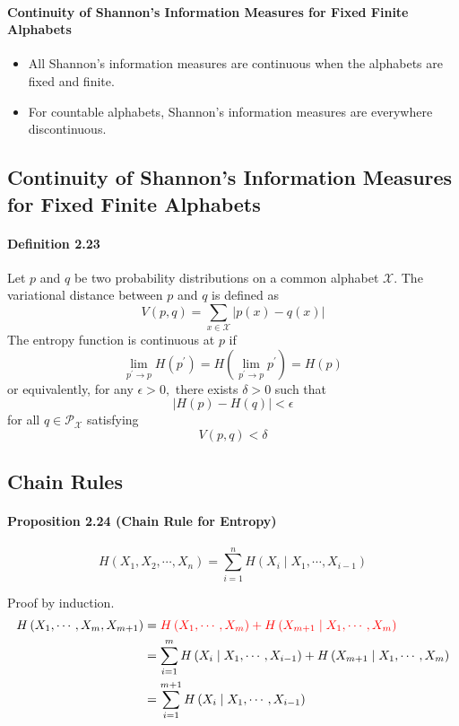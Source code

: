 \documentclass[8pt]{article}
\begin{document}
\paragraph{Continuity of Shannon’s Information Measures for Fixed Finite Alphabets}
\begin{itemize}
	\item All Shannon’s information measures are continuous when the alphabets are fixed and finite.
	\item For countable alphabets, Shannon’s information measures are everywhere discontinuous.
\end{itemize}

\subsection{Continuity of Shannon’s Information Measures for Fixed Finite Alphabets}
\paragraph{Definition 2.23} Let $p$ and $q$ be two probability distributions on a common alphabet $\mathcal{X}$. The variational distance between $p$ and $q$ is defined as
$$
V(p, q)=\sum_{x \in \mathcal{X}}|p(x)-q(x)|
$$
The entropy function is continuous at $p$ if
$$
\lim _{p^{\prime} \rightarrow p} H\left(p^{\prime}\right)=H\left(\lim _{p^{\prime} \rightarrow p} p^{\prime}\right)=H(p)
$$
or equivalently, for any $\epsilon>0,$ there exists $\delta>0$ such that
$$
|H(p)-H(q)|<\epsilon
$$
for all $q \in \mathcal{P}_{\mathcal{X}}$ satisfying
$$
V(p, q)<\delta
$$

\subsection{Chain Rules}
\begin{tcolorbox}
\paragraph{Proposition 2.24 (Chain Rule for Entropy)}
$$
H\left(X_{1}, X_{2}, \cdots, X_{n}\right)=\sum_{i=1}^{n} H\left(X_{i} \mid X_{1}, \cdots, X_{i-1}\right)
$$
\end{tcolorbox}
Proof by induction.
$$
\begin{aligned}
H\left(X_{1}, \cdots, X_{m}, X_{m+1}\right) &= \color{red} H\left(X_{1}, \cdots, X_{m}\right)+H\left(X_{m+1} \mid X_{1}, \cdots, X_{m}\right) \\
&=\sum_{i=1}^{m} H\left(X_{i} \mid X_{1}, \cdots, X_{i-1}\right)+H\left(X_{m+1} \mid X_{1}, \cdots, X_{m}\right) \\
&=\sum_{i=1}^{m+1} H\left(X_{i} \mid X_{1}, \cdots, X_{i-1}\right)
\end{aligned}
$$
\end{document}
